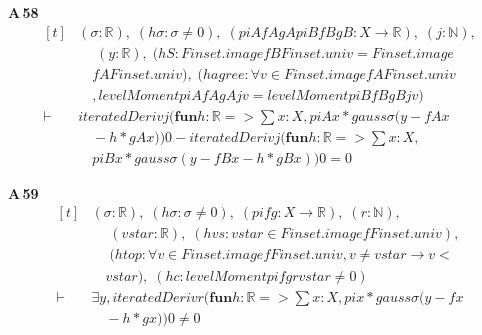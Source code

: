 \noindent\textbf{A\,58}\quad{}
{\footnotesize\[ \begin{aligned}[t]
&(\sigma : \mathbb{R} ),\; (\mathit{hσ} : \sigma \neq 0),\; (\mathit{piA} \mathit{fA} \mathit{gA} \mathit{piB} \mathit{fB} \mathit{gB} : \mathit{X} \to \mathbb{R} ),\; (\mathit{j} : \mathbb{N} ),\\
&\quad \; (\mathit{y} : \mathbb{R} ),\; (\mathit{hS} : \mathit{Finset}.\mathit{image} \mathit{fB} \mathit{Finset}.\mathit{univ} = \mathit{Finset}.\mathit{image}\\
&\quad \mathit{fA} \mathit{Finset}.\mathit{univ}),\; (\mathit{hagree} : \forall \mathit{v} \in \mathit{Finset}.\mathit{image} \mathit{fA} \mathit{Finset}.\mathit{univ}\\
&\quad , \mathit{levelMoment} \mathit{piA} \mathit{fA} \mathit{gA} \mathit{j} \mathit{v} = \mathit{levelMoment} \mathit{piB} \mathit{fB} \mathit{gB} \mathit{j} \mathit{v})\\
\vdash\;&\mathit{iteratedDeriv} \mathit{j} (\mathbf{fun} \mathit{h} : \mathbb{R} => \textstyle\sum \mathit{x} : \mathit{X}, \mathit{piA} \mathit{x} * \mathit{gauss} \sigma (\mathit{y} - \mathit{fA} \mathit{x}\\
&\quad - \mathit{h} * \mathit{gA} \mathit{x})) 0 - \mathit{iteratedDeriv} \mathit{j} (\mathbf{fun} \mathit{h} : \mathbb{R} => \textstyle\sum \mathit{x} : \mathit{X},\\
&\quad \mathit{piB} \mathit{x} * \mathit{gauss} \sigma (\mathit{y} - \mathit{fB} \mathit{x} - \mathit{h} * \mathit{gB} \mathit{x})) 0 = 0
\end{aligned} \]}

\noindent\textbf{A\,59}\quad{}
{\footnotesize\[ \begin{aligned}[t]
&(\sigma : \mathbb{R} ),\; (\mathit{hσ} : \sigma \neq 0),\; (\mathit{pi} \mathit{f} \mathit{g} : \mathit{X} \to \mathbb{R} ),\; (\mathit{r} : \mathbb{N} ),\\
&\quad \; (\mathit{vstar} : \mathbb{R} ),\; (\mathit{hvs} : \mathit{vstar} \in \mathit{Finset}.\mathit{image} \mathit{f} \mathit{Finset}.\mathit{univ}),\\
&\quad \; (\mathit{htop} : \forall \mathit{v} \in \mathit{Finset}.\mathit{image} \mathit{f} \mathit{Finset}.\mathit{univ}, \mathit{v} \neq \mathit{vstar} \to \mathit{v} <\\
&\quad \mathit{vstar}),\; (\mathit{hc} : \mathit{levelMoment} \mathit{pi} \mathit{f} \mathit{g} \mathit{r} \mathit{vstar} \neq 0)\\
\vdash\;&\exists \mathit{y}, \mathit{iteratedDeriv} \mathit{r} (\mathbf{fun} \mathit{h} : \mathbb{R} => \textstyle\sum \mathit{x} : \mathit{X}, \mathit{pi} \mathit{x} * \mathit{gauss} \sigma (\mathit{y} - \mathit{f} \mathit{x}\\
&\quad - \mathit{h} * \mathit{g} \mathit{x})) 0 \neq 0
\end{aligned} \]}

